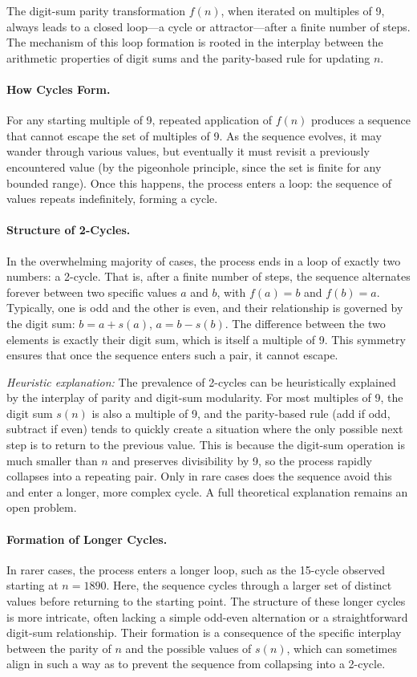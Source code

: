 \documentclass[12pt]{article}
\begin{document}
The digit-sum parity transformation $f(n)$, when iterated on multiples of 9, always leads to a closed loop---a cycle or attractor---after a finite number of steps. The mechanism of this loop formation is rooted in the interplay between the arithmetic properties of digit sums and the parity-based rule for updating $n$.

\paragraph{How Cycles Form.} For any starting multiple of 9, repeated application of $f(n)$ produces a sequence that cannot escape the set of multiples of 9. As the sequence evolves, it may wander through various values, but eventually it must revisit a previously encountered value (by the pigeonhole principle, since the set is finite for any bounded range). Once this happens, the process enters a loop: the sequence of values repeats indefinitely, forming a cycle.

\paragraph{Structure of 2-Cycles.} In the overwhelming majority of cases, the process ends in a loop of exactly two numbers: a 2-cycle. That is, after a finite number of steps, the sequence alternates forever between two specific values $a$ and $b$, with $f(a) = b$ and $f(b) = a$. Typically, one is odd and the other is even, and their relationship is governed by the digit sum: $b = a + s(a)$, $a = b - s(b)$. The difference between the two elements is exactly their digit sum, which is itself a multiple of 9. This symmetry ensures that once the sequence enters such a pair, it cannot escape.

\textit{Heuristic explanation:} The prevalence of 2-cycles can be heuristically explained by the interplay of parity and digit-sum modularity. For most multiples of 9, the digit sum $s(n)$ is also a multiple of 9, and the parity-based rule (add if odd, subtract if even) tends to quickly create a situation where the only possible next step is to return to the previous value. This is because the digit-sum operation is much smaller than $n$ and preserves divisibility by 9, so the process rapidly collapses into a repeating pair. Only in rare cases does the sequence avoid this and enter a longer, more complex cycle. A full theoretical explanation remains an open problem.

\paragraph{Formation of Longer Cycles.} In rarer cases, the process enters a longer loop, such as the 15-cycle observed starting at $n=1890$. Here, the sequence cycles through a larger set of distinct values before returning to the starting point. The structure of these longer cycles is more intricate, often lacking a simple odd-even alternation or a straightforward digit-sum relationship. Their formation is a consequence of the specific interplay between the parity of $n$ and the possible values of $s(n)$, which can sometimes align in such a way as to prevent the sequence from collapsing into a 2-cycle.
\end{document}
